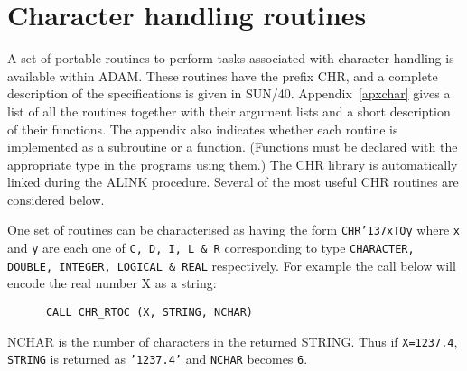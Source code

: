 \documentclass[twoside,11pt]{article}
\renewcommand{\_}{{\tt\char'137}}
\newcommand{\xref}[3]{#1}
\newcommand{\xlabel}[1]{}
\begin{document}
\newpage
\section{Character handling routines\label{char}\xlabel{character_handling_routines}}

A set of portable routines to perform tasks associated with
character handling is available within ADAM.
These routines have the prefix CHR, and a complete description of the
specifications is given in \xref{SUN/40}{sun40}{}.
Appendix~\ref{apxchar} gives a list of all the routines together with
their argument lists and a short description of their functions.
The appendix also indicates
whether  each routine is implemented as a subroutine or a function.
(Functions must be declared with the appropriate type in the programs using
them.)
The CHR library is automatically linked during the ALINK procedure.
Several of the most useful CHR routines are considered below.

One set of routines can be characterised as having the form
{\tt CHR\_xTOy} where {\tt x} and {\tt y} are each  one
of {\tt C, D, I, L \& R} corresponding to type
{\tt CHARACTER, DOUBLE, INTEGER, LOGICAL \& REAL} respectively.
For example the call below will encode the  real number X as a string:
\begin{verbatim}
      CALL CHR_RTOC (X, STRING, NCHAR)
\end{verbatim}
NCHAR is the number of characters in the returned STRING.
Thus if {\tt X=1237.4}, {\tt STRING} is returned as {\tt'1237.4'}
and {\tt NCHAR} becomes {\tt 6}.
\end{document}
